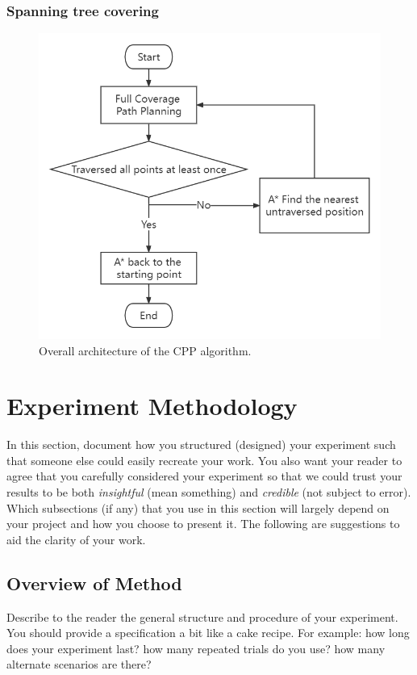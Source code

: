 \documentclass[conference]{IEEEtran}
\begin{document}
\subsubsection{Spanning tree covering}
\begin{figure}[htbp]
\centerline{\includegraphics[scale=0.35]{RS_Report/RS_Report (1).png}}
\caption{Overall architecture of the CPP algorithm.}
\label{fig4}
\end{figure}


\section{Experiment Methodology}

In this section, document how you structured (designed) your experiment such that someone else could easily recreate your work.  You also want your reader to agree that you carefully considered your experiment so that we could trust your results to be both \emph{insightful} (mean something) and \emph{credible} (not subject to error).  Which subsections (if any) that you use in this section will largely depend on your project and how you choose to present it.  The following are suggestions to aid the clarity of your work.

\subsection{Overview of Method}
Describe to the reader the general structure and procedure of your experiment. You should provide a specification a bit like a cake recipe.  For example: how long does your experiment last?  how many repeated trials do you use?  how many alternate scenarios are there?
\end{document}
